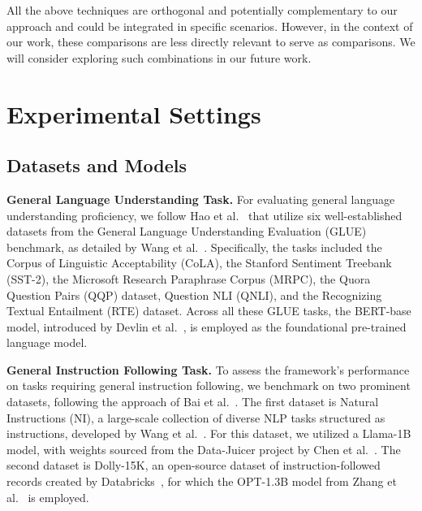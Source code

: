 \documentclass{article} %
\begin{document}
All the above techniques are orthogonal and potentially complementary to our approach and could be integrated in specific scenarios. However, in the context of our work, these comparisons are less directly relevant to serve as comparisons. We will consider exploring such combinations in our future work.




\section{Experimental Settings}\label{appendixsection:settings}

\subsection{Datasets and Models}\label{appendixsection:datasets}
\textbf{General Language Understanding Task.}
For evaluating general language understanding proficiency, we follow Hao et al.~\cite{haoboincreasing} that utilize six well-established datasets from the General Language Understanding Evaluation (GLUE) benchmark, as detailed by Wang et al.~\cite{wang2018glue}. Specifically, the tasks included the Corpus of Linguistic Acceptability (CoLA), the Stanford Sentiment Treebank (SST-2), the Microsoft Research Paraphrase Corpus (MRPC), the Quora Question Pairs (QQP) dataset, Question NLI (QNLI), and the Recognizing Textual Entailment (RTE) dataset. Across all these GLUE tasks, the BERT-base model, introduced by Devlin et al.~\cite{devlin2019bert}, is employed as the foundational pre-trained language model.

\noindent\textbf{General Instruction Following Task.}
To assess the framework's performance on tasks requiring general instruction following, we benchmark on two prominent datasets, following the approach of Bai et al.~\cite{bai2024federated}. The first dataset is Natural Instructions (NI), a large-scale collection of diverse NLP tasks structured as instructions, developed by Wang et al.~\cite{wang2022super}. For this dataset, we utilized a Llama-1B model, with weights sourced from the Data-Juicer project by Chen et al.~\cite{chen2024data}. The second dataset is Dolly-15K, an open-source dataset of instruction-followed records created by Databricks~\cite{conover2023free}, for which the OPT-1.3B model from Zhang et al.~\cite{zhang2022opt} is employed.
\end{document}
